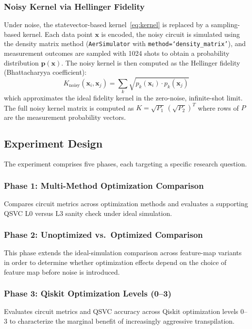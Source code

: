 \documentclass{ieeeaccess}
\begin{document}
\subsubsection{Noisy Kernel via Hellinger Fidelity}
Under noise, the statevector-based kernel~\eqref{eq:kernel} is replaced by a sampling-based kernel. Each data point $\mathbf{x}$ is encoded, the noisy circuit is simulated using the density matrix method (\texttt{AerSimulator} with \texttt{method=`density\_matrix'}), and measurement outcomes are sampled with 1024 shots to obtain a probability distribution $\mathbf{p}(\mathbf{x})$. The noisy kernel is then computed as the Hellinger fidelity (Bhattacharyya coefficient):
\begin{equation}
K_{\text{noisy}}(\mathbf{x}_i, \mathbf{x}_j) = \sum_{k} \sqrt{p_k(\mathbf{x}_i) \cdot p_k(\mathbf{x}_j)}
\label{eq:hellinger}
\end{equation}
which approximates the ideal fidelity kernel in the zero-noise, infinite-shot limit. The full noisy kernel matrix is computed as $K = \sqrt{P_1}\, (\sqrt{P_2})^T$ where rows of $P$ are the measurement probability vectors.

\subsection{Experiment Design}
\label{sec:experiment_design}

The experiment comprises five phases, each targeting a specific research question.

\subsubsection{Phase 1: Multi-Method Optimization Comparison}
Compares circuit metrics across optimization methods and evaluates a supporting QSVC L0 versus L3 sanity check under ideal simulation.

\subsubsection{Phase 2: Unoptimized vs.\ Optimized Comparison}
This phase extends the ideal-simulation comparison across feature-map variants in order to determine whether optimization effects depend on the choice of feature map before noise is introduced.

\subsubsection{Phase 3: Qiskit Optimization Levels (0--3)}
Evaluates circuit metrics and QSVC accuracy across Qiskit optimization levels 0--3 to characterize the marginal benefit of increasingly aggressive transpilation.
\end{document}
